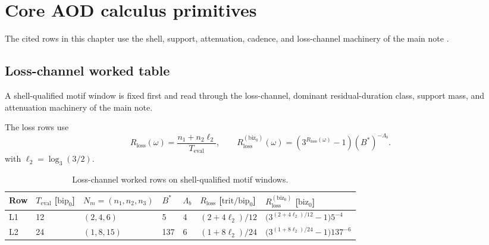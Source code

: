 \section{Core AOD calculus primitives}

The cited rows in this chapter use the shell, support, attenuation, cadence, and loss-channel machinery of the main note \cite{aod43_main_2026}.

\subsection{Loss-channel worked table}
\label{man:loss-channel-worked-table}
A shell-qualified motif window is fixed first and read through the loss-channel, dominant residual-duration class, support mass, and attenuation machinery of the main note.\par\smallskip
{}

The loss rows use
\[
R_{\mathrm{loss}}(\omega)=\frac{n_1+n_2\ell_2}{T_{\mathrm{eval}}},
\qquad
R_{\mathrm{loss}}^{(\mathrm{biz}_0)}(\omega)=\left(3^{R_{\mathrm{loss}}(\omega)}-1\right)(B^*)^{-\Lambda_b}.
\]
with \(\ell_2=\log_3(3/2)\).

\begin{table}[H]
\centering
\caption{Loss-channel worked rows on shell-qualified motif windows.}
\label{tab:manual-loss-channel-worked}
\begin{threeparttable}
\small
\begin{tabular}{@{}lllllll@{}}
\toprule
Row & $T_{\mathrm{eval}}$ [\(\mathrm{bip}_0\)] & $N_m=(n_1,n_2,n_3)$ & $B^*$ & $\Lambda_b$ & $R_{\mathrm{loss}}$ [\(\mathrm{trit}/\mathrm{bip}_0\)] & $R_{\mathrm{loss}}^{(\mathrm{biz}_0)}$ [\(\mathrm{biz}_0\)] \\
\midrule
L1 & 12 & $(2,4,6)$ & 5 & 4 & $(2+4\ell_2)/12$ & $\bigl(3^{(2+4\ell_2)/12}-1\bigr)5^{-4}$ \\
L2 & 24 & $(1,8,15)$ & 137 & 6 & $(1+8\ell_2)/24$ & $\bigl(3^{(1+8\ell_2)/24}-1\bigr)137^{-6}$ \\
\bottomrule
\end{tabular}
\end{threeparttable}
\end{table}

